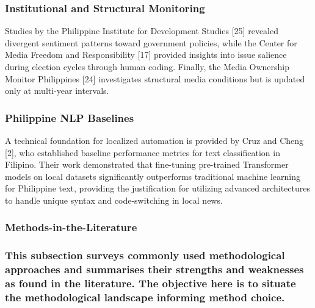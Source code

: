 \subsubsection{\texorpdfstring{\textbf{Institutional and Structural Monitoring}}{Institutional and Structural Monitoring}}\label{institutional-and-structural-monitoring}

Studies by the Philippine Institute for Development Studies {[}25{]} revealed divergent sentiment patterns toward government policies, while the Center for Media Freedom and Responsibility {[}17{]} provided insights into issue salience during election cycles through human coding. Finally, the Media Ownership Monitor Philippines {[}24{]} investigates structural media conditions but is updated only at multi-year intervals.

\subsubsection{\texorpdfstring{\textbf{Philippine NLP Baselines}}{Philippine NLP Baselines}}\label{philippine-nlp-baselines}

A technical foundation for localized automation is provided by Cruz and Cheng {[}2{]}, who established baseline performance metrics for text classification in Filipino. Their work demonstrated that fine-tuning pre-trained Transformer models on local datasets significantly outperforms traditional machine learning for Philippine text, providing the justification for utilizing advanced architectures to handle unique syntax and code-switching in local news.

\subsubsection{\texorpdfstring{\textbf{Methods-in-the-Literature}}{Methods-in-the-Literature}}\label{methods-in-the-literature}

\subsubsection{This subsection surveys commonly used methodological approaches and summarises their strengths and weaknesses as found in the literature. The objective here is to situate the methodological landscape informing method choice.}\label{this-subsection-surveys-commonly-used-methodological-approaches-and-summarises-their-strengths-and-weaknesses-as-found-in-the-literature.-the-objective-here-is-to-situate-the-methodological-landscape-informing-method-choice.}


